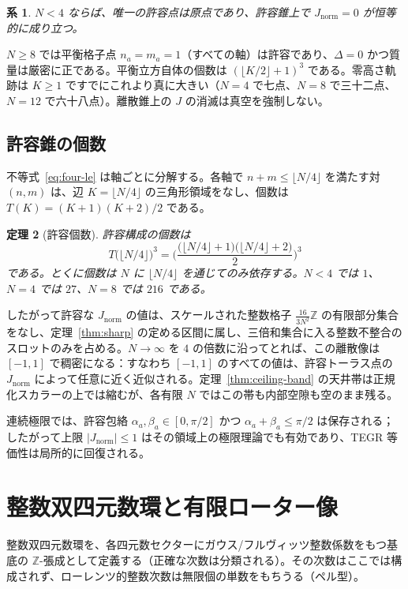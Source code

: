 \documentclass[a4paper]{article}
\newtheorem{theorem}{定理}[section]
\newtheorem{corollary}[theorem]{系}
\theoremstyle{definition}
\newcommand{\Jnorm}{J_{\mathrm{norm}}}
\begin{document}
\begin{corollary}
\label{cor:small-N}
$N<4$ ならば、唯一の許容点は原点であり、許容錐上で $\Jnorm=0$ が恒等的に成り立つ。
\end{corollary}

$N\geq 8$ では平衡格子点 $n_a=m_a=1$（すべての軸）は許容であり、$\Delta=0$ かつ質量は厳密に正である。平衡立方自体の個数は $(\lfloor K/2\rfloor+1)^3$ である。零高さ軌跡は $K\geq 1$ ですでにこれより真に大きい（$N=4$ で七点、$N=8$ で三十二点、$N=12$ で六十八点）。離散錐上の $J$ の消滅は真空を強制しない。

\subsection{許容錐の個数}

不等式~\eqref{eq:four-le} は軸ごとに分解する。各軸で $n+m\leq\lfloor N/4\rfloor$ を満たす対 $(n,m)$ は、辺 $K=\lfloor N/4\rfloor$ の三角形領域をなし、個数は $T(K)=(K+1)(K+2)/2$ である。

\begin{theorem}[許容個数]
\label{thm:card}
許容構成の個数は
\[
T\bigl(\lfloor N/4\rfloor\bigr)^3=\Biggl(\frac{\bigl(\lfloor N/4\rfloor+1\bigr)\bigl(\lfloor N/4\rfloor+2\bigr)}{2}\Biggr)^3
\]
である。とくに個数は $N$ に $\lfloor N/4\rfloor$ を通じてのみ依存する。$N<4$ では $1$、$N=4$ では $27$、$N=8$ では $216$ である。
\end{theorem}

したがって許容な $\Jnorm$ の値は、スケールされた整数格子 $\frac{16}{3N^2}\mathbb{Z}$ の有限部分集合をなし、定理~\ref{thm:sharp} の定める区間に属し、三倍和集合に入る整数不整合のスロットのみを占める。$N\to\infty$ を $4$ の倍数に沿ってとれば、この離散像は $[-1,1]$ で稠密になる：すなわち $[-1,1]$ のすべての値は、許容トーラス点の $\Jnorm$ によって任意に近く近似される。定理~\ref{thm:ceiling-band} の天井帯は正規化スカラーの上では縮むが、各有限 $N$ ではこの帯も内部空隙も空のまま残る。

連続極限では、許容包絡 $\alpha_a,\beta_a\in[0,\pi/2]$ かつ $\alpha_a+\beta_a\leq\pi/2$ は保存される；したがって上限 $|\Jnorm|\leq 1$ はその領域上の極限理論でも有効であり、TEGR 等価性は局所的に回復される。

\section{整数双四元数環と有限ローター像}
\label{sec:integer}

整数双四元数環を、各四元数セクターにガウス/フルヴィッツ整数係数をもつ基底の $\mathbb{Z}$-張成として定義する（正確な次数は分類される）。その次数はここでは構成されず、ローレンツ的整数次数は無限個の単数をもちうる（ペル型）。
\end{document}
